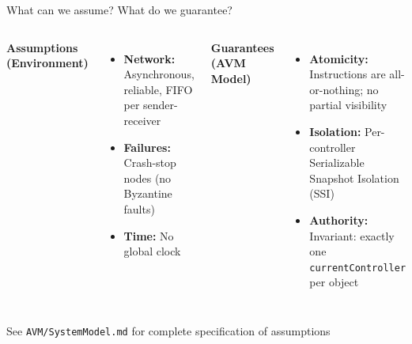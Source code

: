 \documentclass[handout,aspectratio=169,xcolor=dvipsnames,10pt]{beamer}
\begin{document}
\begin{frame}{What can we assume? What do we guarantee?}

\begin{columns}[T]

\textbf{Assumptions (Environment)}
\begin{itemize}\small
  \item \textbf{Network:} Asynchronous, reliable, FIFO per sender-receiver
  \item \textbf{Failures:} Crash-stop nodes (no Byzantine faults)
  \item \textbf{Time:} No global clock
\end{itemize}


\textbf{Guarantees (AVM Model)}
\begin{itemize}\small
  \item \textbf{Atomicity:} Instructions are all-or-nothing; no partial visibility
  \item \textbf{Isolation:} Per-controller Serializable Snapshot Isolation (SSI)
  \item \textbf{Authority:} Invariant: exactly one \texttt{currentController} per object
\end{itemize}

\end{columns}

\vspace{0.8em}

{\footnotesize See \texttt{AVM/SystemModel.md} for complete specification of assumptions}

\end{frame}

\end{document}
